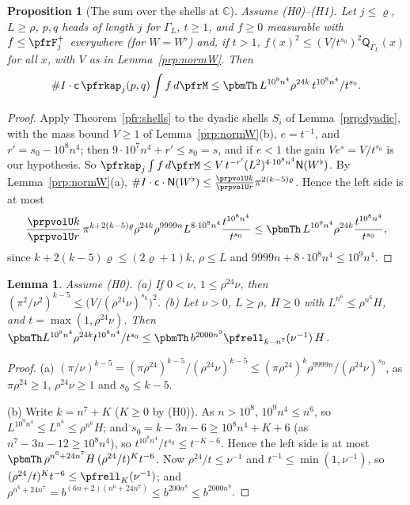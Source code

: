 \documentclass[10pt]{amsart}
\newtheorem{proposition}[theorem]{Proposition}
\newtheorem{lemma}[theorem]{Lemma}
\theoremstyle{definition}
\theoremstyle{remark}
\newcommand{\C}{\mathbb C}
\begin{document}
\begin{proposition}[The sum over the shells at $\C$]\label{prp:sum}
Assume \textup{(H0)}--\textup{(H1)}. Let $j\le\varrho$, $L\ge\rho$, $p,q$ heads of length $j$ for $\Gamma_L$,
$t\ge1$, and $f\ge0$ measurable with $f\le\pfrF^+_j$ everywhere \textup{(}for $W=W^\flat$\textup{)} and, if
$t>1$, $f(x)^2\le(V/t^{s_0})^2\mathsf Q_{\Gamma_L}(x)$ for all $x$, with $V$ as in Lemma~\ref{prp:normW}. Then
\[
\#I\cdot\mathsf c\,\pfrkap_j(p,q)\int f\,d\pfrM\le\pbmTh\,L^{10^9n^4}\rho^{24k}\,t^{10^8n^4}/t^{s_0}.
\]
\end{proposition}
\begin{proof}
Apply Theorem~\ref{pfr:shells} to the dyadic shells $S_i$ of Lemma~\ref{prp:dyadic}, with the mass bound $V\ge1$
of Lemma~\ref{prp:normW}(b), $e=t^{-1}$, and $r'=s_0-10^8n^4$; then $9\cdot10^7n^4+r'\le s_0=s$, and if $e<1$ the
gain $Ve^{s}=V/t^{s_0}$ is our hypothesis. So
$\pfrkap_j\int f\,d\pfrM\le V\,t^{-r'}(L^2)^{4\cdot10^8n^4}\mathsf N(W^\flat)$. By Lemma~\ref{prp:normW}(a),
$\#I\cdot\mathsf c\cdot\mathsf N(W^\flat)\le\frac{\prpvolU k}{\prpvolU r}\pi^{2(k-5)\varrho}$. Hence the left side is at most
\[
\frac{\prpvolU k}{\prpvolU r}\,\pi^{k+2(k-5)\varrho}\rho^{24k}\rho^{9999n}L^{8\cdot10^8n^4}\frac{t^{10^8n^4}}{t^{s_0}}
\le\pbmTh\,L^{10^9n^4}\rho^{24k}\frac{t^{10^8n^4}}{t^{s_0}},
\]
since $k+2(k-5)\varrho\le(2\varrho+1)k$, $\rho\le L$ and $9999n+8\cdot10^8n^4\le10^9n^4$.
\end{proof}

\begin{lemma}\label{prp:arith}
Assume \textup{(H0)}. \textup{(a)} If $0<\nu$, $1\le\rho^{24}\nu$, then $(\pi^2/\nu^2)^{k-5}\le\bigl(V/(\rho^{24}\nu)^{s_0}\bigr)^2$.
\textup{(b)} Let $\nu>0$, $L\ge\rho$, $H\ge0$ with $L^{n^6}\le\rho^{n^6}H$, and $t=\max(1,\rho^{24}\nu)$. Then
$\pbmTh L^{10^9n^4}\rho^{24k}t^{10^8n^4}/t^{s_0}\le\pbmTh\,b^{2000n^9}\pfrell_{k-n^7}(\nu^{-1})\,H$.
\end{lemma}
\begin{proof}
(a) $(\pi/\nu)^{k-5}=(\pi\rho^{24})^{k-5}/(\rho^{24}\nu)^{k-5}\le(\pi\rho^{24})^k\rho^{9999n}/(\rho^{24}\nu)^{s_0}$, as
$\pi\rho^{24}\ge1$, $\rho^{24}\nu\ge1$ and $s_0\le k-5$.

(b) Write $k=n^7+K$ ($K\ge0$ by (H0)). As $n>10^8$, $10^9n^4\le n^6$, so $L^{10^9n^4}\le L^{n^6}\le\rho^{n^6}H$; and
$s_0=k-3n-6\ge10^8n^4+K+6$ (as $n^7-3n-12\ge10^8n^4$), so $t^{10^8n^4}/t^{s_0}\le t^{-K-6}$. Hence the left side
is at most $\pbmTh\,\rho^{n^6+24n^7}H\,(\rho^{24}/t)^Kt^{-6}$. Now $\rho^{24}/t\le\nu^{-1}$ and $t^{-1}\le\min(1,\nu^{-1})$,
so $(\rho^{24}/t)^Kt^{-6}\le\pfrell_K(\nu^{-1})$; and $\rho^{n^6+24n^7}=b^{(6n+2)(n^6+24n^7)}\le b^{200n^8}\le b^{2000n^9}$.
\end{proof}
\end{document}
